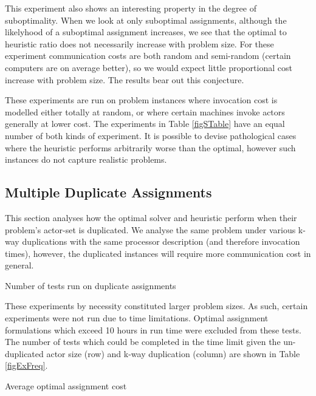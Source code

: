 This experiment also shows an interesting property in the degree of suboptimality.
When we look at only suboptimal assignments, although the likelyhood of a suboptimal assignment increases, we see that the optimal to heuristic ratio does not necessarily increase with problem size.
For these experiment communication costs are both random and semi-random (certain computers are on average better), so we would expect little proportional cost increase with problem size.
The results bear out this conjecture.

These experiments are run on problem instances where invocation cost is modelled either totally at random, or where certain machines invoke actors generally at lower cost.
The experiments in Table \ref{figSTable} have an equal number of both kinds of experiment.
It is possible to devise pathological cases where the heuristic performs arbitrarily worse than the optimal, however such instances do not capture realistic problems.

\subsection{Multiple Duplicate Assignments}
\label{secExMulAssign}

This section analyses how the optimal solver and heuristic perform when their problem's actor-set is duplicated.
We analyse the same problem under various k-way duplications with the same processor description (and therefore invocation times), however, the duplicated instances will require more communication cost in general.

\begin{table}
\begin{center}
	
\caption{Number of tests run on duplicate assignments}
\label{figExFreq}
\end{center}
\end{table}

These experiments by necessity constituted larger problem sizes.
As such, certain experiments were not run due to time limitations.
Optimal assignment formulations which exceed 10 hours in run time were excluded from these tests.
The number of tests which could be completed in the time limit given the un-duplicated actor size (row) and k-way duplication (column) are shown in Table \ref{figExFreq}.

\begin{table}
\begin{center}
	
\caption{Average optimal assignment cost}
\label{figExRamp}
\end{center}
\end{table}

